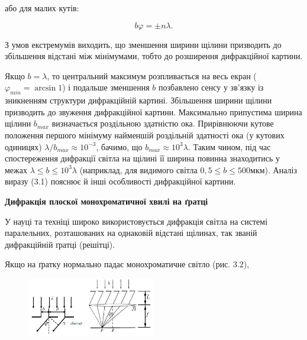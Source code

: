 \documentclass[12pt,a4paper]{article}
\begin{document}
    або для малих кутів:

    \begin{equation}
        b\varphi = \pm n \lambda.
        \tag{3.3}
    \end{equation}

    З умов екстремумів виходить, що зменшення ширини щілини призводить до
    збільшення відстані між мінімумами, тобто до розширення дифракційної
    картини.

    Якщо $b = \lambda$, то центральний максимум розпливається на весь екран ($\varphi_{min} = \arcsin 1$)
    і подальше зменшення $b$ позбавлено сенсу у зв'язку із зникненням
    структури дифракційній картині. Збільшення ширини щілини призводить до
    звуження дифракційної картини. Максимально припустима ширина щілини $b_{max}$
    визначається роздільною здатністю ока.
    Прирівнюючи кутове положення першого мінімуму найменшій роздільній здатності
    ока (у кутових одиницях) $\lambda \slash b_{max} \approx 10^{-3}$, бачимо,
    що $b_{max} \approx 10^3 \lambda$. Таким чином, під час спостереження
    дифракції світла на щілині її ширина повинна знаходитись у межах $\lambda \leq b \leq 10^3 \lambda$
    (наприклад, для видимого світла $0,5 \leq b \leq 500 \text{мкм}$).
    Аналіз виразу (3.1) пояснює й інші особливості дифракційної картини.

    \begin{center} \textbf{Дифракція плоскої монохроматичної хвилі на ґратці} \end{center}

    У науці та техніці широко використовується дифракція світла на системі
    паралельних, розташованих на однаковій відстані щілинах, так званій
    дифракційній ґратці (решітці).

    Якщо на ґратку нормально падає монохроматичне світло (рис. 3.2),
    
    \begin{figure}[!ht]

        \renewcommand{\thefigure}{3.\arabic{figure}} %

        \centering
        \includegraphics[width=0.5\textwidth]{3.2.png}
        \caption{}
        \label{fig2:schema}

    \end{figure}
    
\end{document}
